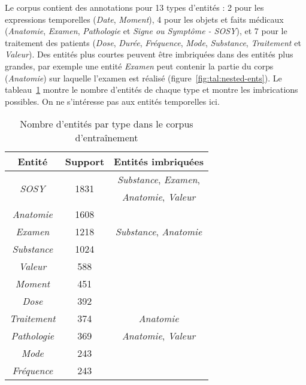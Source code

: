 Le corpus contient des annotations pour \num{13} types d'entités : \num{2} pour les expressions temporelles (\emph{Date}, \emph{Moment}), \num{4} pour les objets et faits médicaux (\emph{Anatomie}, \emph{Examen}, \emph{Pathologie} et \emph{Signe ou Symptôme - SOSY}), et \num{7} pour le traitement des patients (\emph{Dose}, \emph{Durée}, \emph{Fréquence}, \emph{Mode}, \emph{Substance}, \emph{Traitement} et \emph{Valeur}).
Des entités plus courtes peuvent être imbriquées dans des entités plus grandes, par exemple une entité \emph{Examen} peut contenir la partie du corps (\emph{Anatomie}) sur laquelle l'examen est réalisé (figure~\ref{fig:tal:nested-ents}).
Le tableau~\ref{tab:tal:ent} montre le nombre d'entités de chaque type et montre les imbrications possibles.
On ne s'intéresse pas aux entités temporelles ici.

\begin{table}[htb]
    \centering
    \begin{adjustbox}{max width=\linewidth}
        \begin{tabular}{c|c|c}
            Entité                       & Support                     & Entités imbriquées                \\
            \hline
            \hline
            \multirow{2}{*}{\emph{SOSY}} & \multirow{2}{*}{\num{1831}} & \emph{Substance}, \emph{Examen},  \\
                                         &                             & \emph{Anatomie}, \emph{Valeur}    \\
            \emph{Anatomie}              & \num{1608}                  &                                   \\
            \emph{Examen}                & \num{1218}                  & \emph{Substance}, \emph{Anatomie} \\
            \emph{Substance}             & \num{1024}                  &                                   \\
            \emph{Valeur}                & \num{588}                   &                                   \\
            \emph{Moment}                & \num{451}                   &                                   \\
            \emph{Dose}                  & \num{392}                   &                                   \\
            \emph{Traitement}            & \num{374}                   & \emph{Anatomie}                   \\
            \emph{Pathologie}            & \num{369}                   & \emph{Anatomie}, \emph{Valeur}    \\
            \emph{Mode}                  & \num{243}                   &                                   \\
            \emph{Fréquence}             & \num{243}                   &                                   \\
        \end{tabular}
    \end{adjustbox}
    \caption{Nombre d'entités par type dans le corpus d'entraînement}
    \label{tab:tal:ent}
\end{table}

